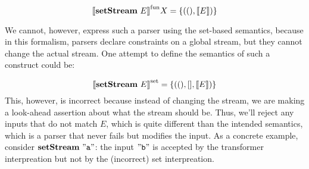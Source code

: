 \documentclass{article}
\begin{document}
\[
{\llbracket{\mathbf{setStream}~{E}}\rrbracket}^{\mathrm{fun}} X = \{{((),\llbracket{E}\rrbracket)}\}
\]

We cannot, however, express such a parser using the set-based semantics,
because in this formalism, parsers declare constraints on a global stream,
but they cannot change the actual stream.  One attempt to define the
semantics of such a construct could be:

\[
{\llbracket{\mathbf{setStream}~{E}}\rrbracket}^{\mathrm{set}} = \{{ ((),[], \llbracket{E}\rrbracket) }\}
\]
This, however, is incorrect because instead of changing the stream,
we are making a look-ahead assertion about what the stream should be.
Thus, we'll reject any inputs that do not match $E$, which is quite
different than the intended semantics, which is a parser that never fails
but modifies the input. As a concrete example, consider $\mathbf{setStream}~{\mathtt{"{a}"}}$:
the input ${\mathtt{"{b}"}}$ is accepted by the transformer interpreation but
not by the (incorrect) set interpreation.
\end{document}
